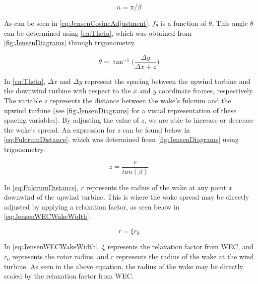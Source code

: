\documentclass[a4paper]{jpconf}
\begin{document}
\begin{equation}
    n = \pi / \beta
    \label{eq:nFactor}
\end{equation}

As can be seen in \cref{eq:JensenCosineAdjustment}, $f_\theta$ is a function of $\theta$. This angle $\theta$ can be determined using \cref{eq:Theta}, which was obtained from \cref{fig:JensenDiagrams} through trigonometry.

\begin{equation}
    \theta = \tan^{-1}\Big( \frac{\Delta y}{\Delta x + z} \Big)
    \label{eq:Theta}
\end{equation}

In \cref{eq:Theta}, $\Delta x$ and $\Delta y$ represent the spacing between the upwind turbine and the downwind turbine with respect to the $x$ and $y$ coordinate frames, respectively. The variable $z$ represents the distance between the wake's fulcrum and the upwind turbine (see \cref{fig:JensenDiagrams} for a visual representation of these spacing variables). By adjusting the value of $z$, we are able to increase or decrease the wake's spread. An expression for $z$ can be found below in \cref{eq:FulcrumDistance}, which was determined from \cref{fig:JensenDiagrams} using trigonometry.

\begin{equation}
    z = \frac{r}{tan(\beta)}
    \label{eq:FulcrumDistance}
\end{equation}

In \cref{eq:FulcrumDistance}, $r$ represents the radius of the wake at any point $x$ downwind of the upwind turbine. This is where the wake spread may be directly adjusted by applying a relaxation factor, as seen below in \cref{eq:JensenWECWakeWidth}.

\begin{equation}
    r = \xi r_0
    \label{eq:JensenWECWakeWidth}
\end{equation}

In \cref{eq:JensenWECWakeWidth}, $\xi$ represents the relaxation factor from WEC, and $r_0$ represents the rotor radius, and $r$ represents the radius of the wake at the wind turbine. As seen in the above equation, the radius of the wake may be directly scaled by the relaxation factor from WEC.
\end{document}
